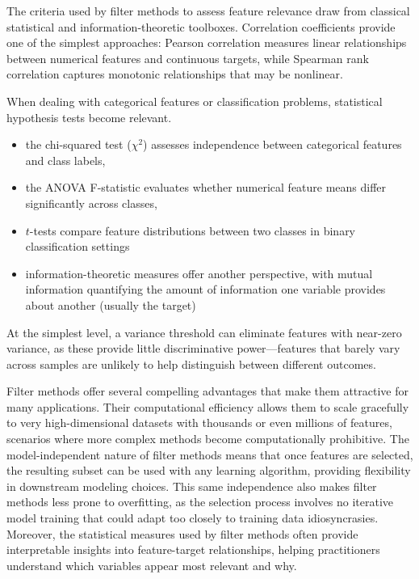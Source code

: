 The criteria used by filter methods to assess feature relevance draw from classical statistical and information-theoretic toolboxes. Correlation coefficients provide one of the simplest approaches: Pearson correlation measures linear relationships between numerical features and continuous targets, while Spearman rank correlation captures monotonic relationships that may be nonlinear. 

When dealing with categorical features or classification problems, statistical hypothesis tests become relevant. 
\begin{itemize}
\item the chi-squared test ($\chi^2$) assesses independence between categorical features and class labels, 
\item the ANOVA F-statistic evaluates whether numerical feature means differ significantly across classes, 
\item $t$-tests compare feature distributions between two classes in binary classification settings
\item information-theoretic measures offer another perspective, with mutual information quantifying the amount of information one variable provides about another (usually the target)
\end{itemize}
At the simplest level, a variance threshold can eliminate features with near-zero variance, as these provide little discriminative power—features that barely vary across samples are unlikely to help distinguish between different outcomes.

Filter methods offer several compelling advantages that make them attractive for many applications. Their computational efficiency allows them to scale gracefully to very high-dimensional datasets with thousands or even millions of features, scenarios where more complex methods become computationally prohibitive. The model-independent nature of filter methods means that once features are selected, the resulting subset can be used with any learning algorithm, providing flexibility in downstream modeling choices. This same independence also makes filter methods less prone to overfitting, as the selection process involves no iterative model training that could adapt too closely to training data idiosyncrasies. Moreover, the statistical measures used by filter methods often provide interpretable insights into feature-target relationships, helping practitioners understand which variables appear most relevant and why.

